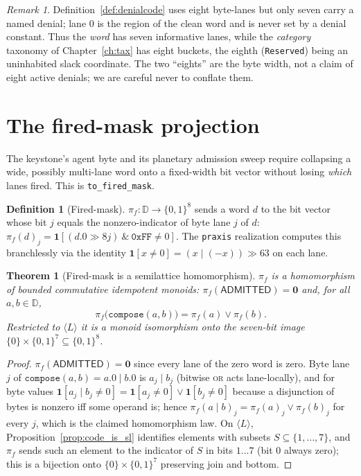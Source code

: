 \documentclass[11pt,oneside]{book}
\theoremstyle{definition}
\newtheorem{definition}{Definition}[chapter]
\theoremstyle{plain}
\newtheorem{theorem}{Theorem}[chapter]
\theoremstyle{remark}
\newtheorem*{remark}{Remark}
\newcommand{\code}[1]{\texttt{#1}}
\newcommand{\Deny}{\mathbb{D}}                 %
\newcommand{\Adml}{\mathsf{ADMITTED}}          %
\newcommand{\firedmap}{\pi_{f}}                %
\begin{document}
\begin{remark}
Definition~\ref{def:denialcode} uses eight byte-lanes but only seven carry a named denial;
lane $0$ is the region of the clean word and is never set by a denial constant. Thus the
\emph{word} has seven informative lanes, while the \emph{category} taxonomy of
Chapter~\ref{ch:tax} has eight buckets, the eighth (\code{Reserved}) being an uninhabited
slack coordinate. The two ``eights'' are the byte width, not a claim of eight active denials;
we are careful never to conflate them.
\end{remark}

\section{The fired-mask projection}

The keystone's agent byte and its planetary admission sweep require collapsing a wide,
possibly multi-lane word onto a fixed-width bit vector without losing \emph{which} lanes
fired. This is \code{to\_fired\_mask}.

\begin{definition}[Fired-mask]\label{def:fired}
$\firedmap:\Deny\to\{0,1\}^{8}$ sends a word $d$ to the bit vector whose bit $j$ equals the
nonzero-indicator of byte lane $j$ of $d$: $\firedmap(d)_j=\mathbf 1[(d.0\gg 8j)\ \&\ \code{0xFF}\ne 0]$.
The \code{praxis} realization computes this branchlessly via the identity
$\mathbf 1[x\ne 0]=(x\mathbin{|}(-x))\gg 63$ on each lane.
\end{definition}

\begin{theorem}[Fired-mask is a semilattice homomorphism]\label{thm:firedhom}
$\firedmap$ is a homomorphism of bounded commutative idempotent monoids:
$\firedmap(\Adml)=\bm 0$ and, for all $a,b\in\Deny$,
\[
\firedmap\bigl(\code{compose}(a,b)\bigr)=\firedmap(a)\lor\firedmap(b).
\]
Restricted to $\langle L\rangle$ it is a monoid isomorphism onto the seven-bit image
$\{0\}\times\{0,1\}^{7}\subseteq\{0,1\}^{8}$.
\end{theorem}

\begin{proof}
$\firedmap(\Adml)=\bm 0$ since every lane of the zero word is zero. Byte lane $j$ of
$\code{compose}(a,b)=a.0\mathbin{|}b.0$ is $a_j\mathbin{|}b_j$ (bitwise \textsc{or} acts
lane-locally), and for byte values $\mathbf 1[a_j\mathbin{|}b_j\ne 0]
=\mathbf 1[a_j\ne 0]\lor\mathbf 1[b_j\ne 0]$ because a disjunction of bytes is nonzero iff some
operand is; hence $\firedmap(a\mathbin{|}b)_j=\firedmap(a)_j\lor\firedmap(b)_j$ for every $j$,
which is the claimed homomorphism law. On $\langle L\rangle$, Proposition~\ref{prop:code_is_sl}
identifies elements with subsets $S\subseteq\{1,\dots,7\}$, and $\firedmap$ sends such an
element to the indicator of $S$ in bits $1\ldots7$ (bit $0$ always zero); this is a bijection
onto $\{0\}\times\{0,1\}^{7}$ preserving join and bottom. \end{proof}
\end{document}
